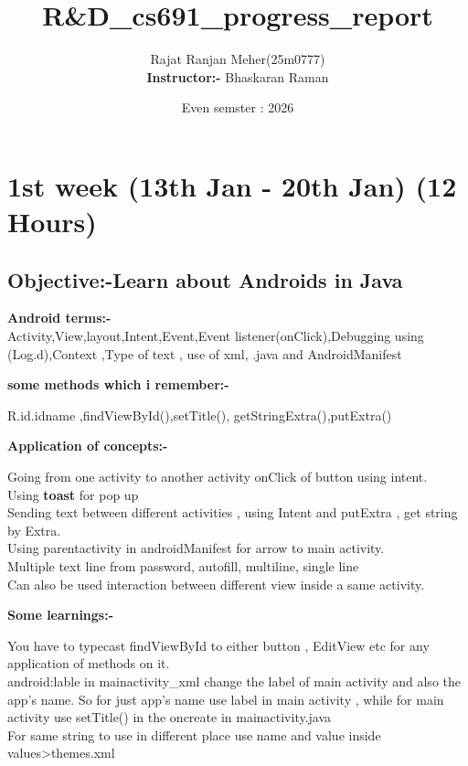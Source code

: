 \documentclass{article}
\title{R\&D\_cs691\_progress\_report}
\author{Rajat Ranjan Meher(25m0777) \\[0.2cm]
\textbf{Instructor:-} Bhaskaran Raman\\
[0.2cm]}
\date{Even semster : 2026}
\begin{document}
\maketitle

\section{1st week (13th Jan - 20th Jan) (12 Hours)}

\subsection{Objective:-Learn about Androids in Java} 
\vspace{0.2cm}

\textbf{Android terms:-}\\

Activity,View,layout,Intent,Event,Event listener(onClick),Debugging using (Log.d),Context ,Type  of text , use  of xml, .java and AndroidManifest\par
\vspace{2mm}
\textbf{some methods which i remember:-}\par
\vspace{2mm}
R.id.idname ,findViewById(),setTitle(), getStringExtra(),putExtra() \par
\vspace{2mm}
\textbf{Application of concepts:-}\par
\vspace{2mm}
Going from one activity to another activity onClick of button using intent.\\
Using \textbf{toast} for pop up \\
Sending text between different activities , using Intent and putExtra , get string by Extra.\\
Using parentactivity in androidManifest for arrow to main activity.\\
Multiple text line from password, autofill, multiline, single line\\
Can also be used interaction between different view inside a same activity.
\par
\vspace{2mm}
\textbf{Some learnings:-}\par
\vspace{2mm}
You have to typecast findViewById to either button , EditView etc for any application of methods on it. \\
android:lable in mainactivity\_xml change the label of main activity and also the app's name. So for just app's name use label in main activity , while for main activity use setTitle() in the oncreate in mainactivity.java\\
For same string to use in different place use name and value inside values>themes.xml
\end{document}
